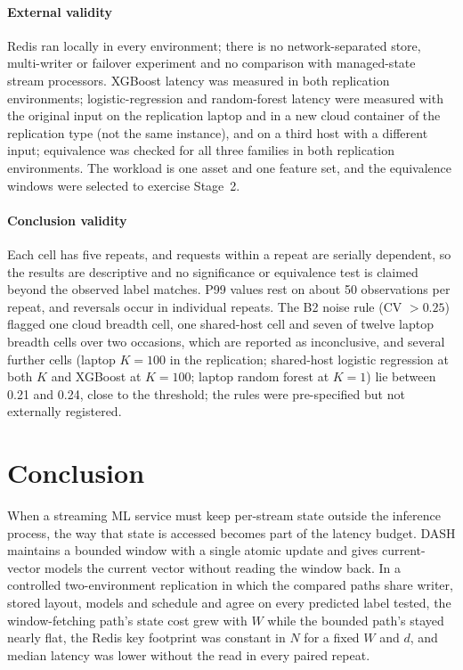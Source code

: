 \documentclass[a4paper,fleqn]{cas-dc}
\begin{document}
\paragraph{External validity} Redis ran locally in every environment; there is no network-separated store, multi-writer or failover experiment and no comparison with managed-state stream processors. XGBoost latency was measured in both replication environments; logistic-regression and random-forest latency were measured with the original input on the replication laptop and in a new cloud container of the replication type (not the same instance), and on a third host with a different input; equivalence was checked for all three families in both replication environments. The workload is one asset and one feature set, and the equivalence windows were selected to exercise Stage~2.

\paragraph{Conclusion validity} Each cell has five repeats, and requests within a repeat are serially dependent, so the results are descriptive and no significance or equivalence test is claimed beyond the observed label matches. P99 values rest on about 50 observations per repeat, and reversals occur in individual repeats. The B2 noise rule (CV $>0.25$) flagged one cloud breadth cell, one shared-host cell and seven of twelve laptop breadth cells over two occasions, which are reported as inconclusive, and several further cells (laptop $K=100$ in the replication; shared-host logistic regression at both $K$ and XGBoost at $K=100$; laptop random forest at $K=1$) lie between 0.21 and 0.24, close to the threshold; the rules were pre-specified but not externally registered.

\section{Conclusion}
\label{sec:conclusion}
When a streaming ML service must keep per-stream state outside the inference process, the way that state is accessed becomes part of the latency budget. DASH maintains a bounded window with a single atomic update and gives current-vector models the current vector without reading the window back. In a controlled two-environment replication in which the compared paths share writer, stored layout, models and schedule and agree on every predicted label tested, the window-fetching path's state cost grew with $W$ while the bounded path's stayed nearly flat, the Redis key footprint was constant in $N$ for a fixed $W$ and $d$, and median latency was lower without the read in every paired repeat.
\end{document}
